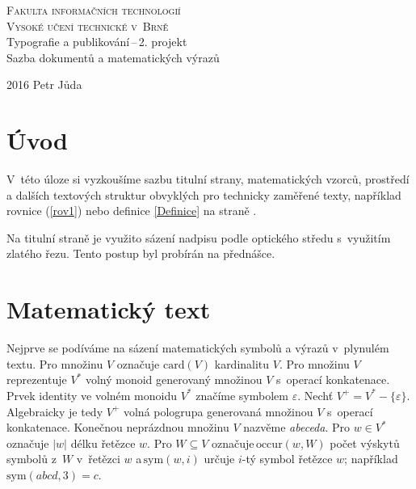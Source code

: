 \documentclass[11pt, a4paper, twocolumn, czech]{article}
\theoremstyle{definition}
\begin{document}
\begin{titlepage}
\begin{center}
\Huge
\textsc{Fakulta informačních technologií\\[-3mm]
Vysoké učení technické v~Brně\\}
\LARGE
{} Typografie a publikování\,--\,2. projekt\\[-1.5mm] Sazba dokumentů a matematických výrazů\\ 
\end{center}
{\Large 2016 \hfill Petr Jůda}
\end{titlepage}

\section*{Úvod}
V~této úloze si vyzkoušíme sazbu titulní strany, matematických vzorců, prostředí a dalších textových struktur obvyklých pro technicky zaměřené texty, například rovnice (\ref{rov1}) nebo definice \ref{Definice} na straně \pageref{Definice}.

Na titulní straně je využito sázení nadpisu podle optického středu s~využitím zlatého řezu. Tento postup byl probírán na přednášce.


\section{Matematický text}
Nejprve se podíváme na sázení matematických symbolů a výrazů v~plynulém textu. Pro množinu $V$ označuje $\mathrm{card}(V)$  kardinalitu $V$.
Pro množinu $V$  reprezentuje $V^*$ volný monoid generovaný množinou $V$ s~operací konkatenace.
Prvek identity ve volném monoidu $V^*$ značíme symbolem $\varepsilon$.
Nechť $V^+=V^*- \{\varepsilon\}$. Algebraicky je tedy $V^+$ volná pologrupa generovaná množinou $V$ s~operací konkatenace.
Konečnou neprázdnou množinu $V$ nazvěme \emph{abeceda}.
Pro $w \in V^*$ označuje $|w|$ délku řetězce $w$. Pro $W\subseteq V$ označuje\,$\mathrm{occur}(w,W)$ počet výskytů symbolů z~$W$ v~řetězci $w$ a\,$\mathrm{sym}(w,i)$ určuje $i$-tý symbol řetězce $w$; například $\mathrm{sym}(abcd,3)=c$.
\end{document}
